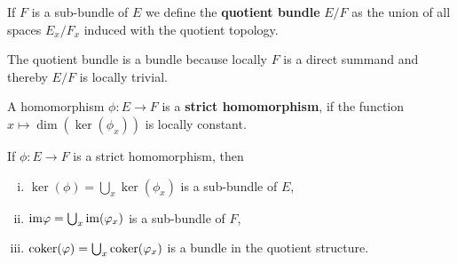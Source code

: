 \begin{definition}\label{def: Quotient bundle}
	If $F$ is a sub-bundle of $E$ we define the \textbf{quotient bundle} $E\slash F$ as the union of all spaces $E_x\slash F_x$ induced with the quotient topology. 
\end{definition}
\begin{corollary}
	The quotient bundle is a bundle because locally $F$ is a direct summand and thereby $E\slash F$ is locally trivial. 
\end{corollary}
\begin{definition}\label{def: Strict homomorphisms}
	A homomorphism $\phi:E\to F$ is a \textbf{strict homomorphism}, if the function $x\mapsto \dim(\ker(\phi_x))$ is locally constant.
\end{definition}
\begin{remark}
	If $\phi:E\to F$ is a strict homomorphism, then 
	\begin{enumerate}[(i)]
		\item $\ker(\phi)=\bigcup_x \ker(\phi_x)$ is a sub-bundle of $E$, \label{enum: ker}
		\item $\mathrm{im}{\varphi}=\bigcup_x \mathrm{im}(\varphi_x)$ is a sub-bundle of $F$, \label{enum: im}
		\item$\operatorname{\mathrm{coker}}(\varphi)=\bigcup_x \operatorname{\mathrm{coker}}(\varphi_x)$ is a bundle in the quotient structure. \label{enum: coker}
	\end{enumerate}
\end{remark}
